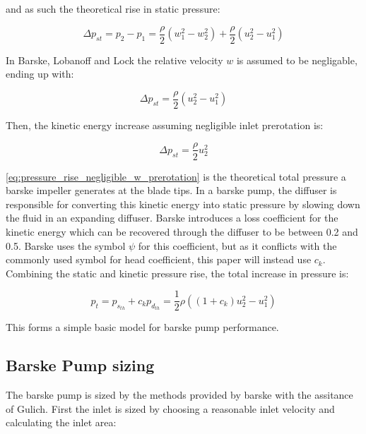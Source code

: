 and as such the theoretical rise in static pressure:

\begin{equation}
    \Delta p_{st} = p_2-p_1 = \frac{\rho}{2}\left(w_1^2-w_2^2\right)+\frac{\rho}{2}\left(u_2^2-u_1^2\right)
    \label{eq:pressure_rise}
\end{equation}

In Barske, Lobanoff and Lock the relative velocity $w$ is assumed to be negligable, ending up with:

\begin{equation}
    \Delta p_{st} = \frac{\rho}{2}\left(u_2^2-u_1^2\right)
    \label{eq:pressure_rise_negligible_w}
\end{equation}

Then, the kinetic energy increase assuming negligible inlet prerotation is:

\begin{equation}
    \Delta p_{st} = \frac{\rho}{2}u_2^2
    \label{eq:pressure_rise_negligible_w_prerotation}
\end{equation}




\cref{eq:pressure_rise_negligible_w_prerotation} is the theoretical total pressure a barske impeller generates at the blade tips. In a barske pump, the diffuser is responsible for converting this kinetic energy into static pressure by slowing down the fluid in an expanding diffuser. Barske introduces a loss coefficient for the kinetic energy which can be recovered through the diffuser to be between 0.2 and 0.5. Barske uses the symbol $\psi$ for this coefficient, but as it conflicts with the commonly used symbol for head coefficient, this paper will instead use $c_k$. Combining the static and kinetic pressure rise, the total increase in pressure is:

\begin{equation}
    p_t = p_{s_{th}} + c_k p_{d_{th}}=\frac{1}{2}\rho\left((1+c_k) u_2^2 - u_1^2\right)
    \label{eq:barske_pressure_rise}
\end{equation}

This forms a simple basic model for barske pump performance. 

\subsection{Barske Pump sizing}

The barske pump is sized by the methods provided by barske \cite{barske1953} with the assitance of Gulich. First the inlet is sized by choosing a reasonable inlet velocity and calculating the inlet area:

